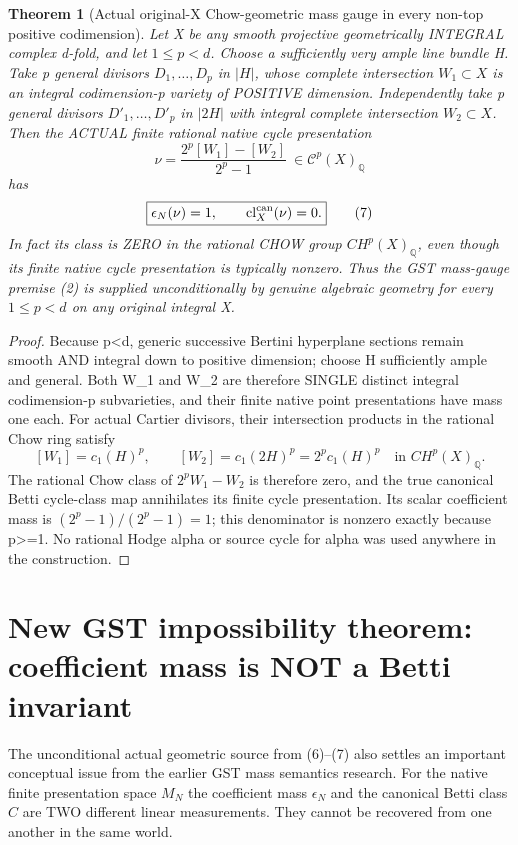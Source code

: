 \documentclass[11pt]{article}
\newtheorem{theorem}{Theorem}
\newcommand{\Q}{\mathbb Q}
\newcommand{\cl}{\mathrm{cl}}
\begin{document}
\begin{theorem}[Actual original-X Chow-geometric mass gauge in every non-top positive codimension]
Let X be any smooth projective geometrically
INTEGRAL complex d-fold, and let
\(1\le p<d\). Choose a sufficiently very ample
line bundle H. Take p general divisors
\(D_1,\ldots,D_p\) in \(|H|\), whose complete
intersection \(W_1\subset X\) is an integral
codimension-p variety of POSITIVE dimension.
Independently take p general divisors
\(D'_1,\ldots,D'_p\) in \(|2H|\) with integral
complete intersection \(W_2\subset X\).
Then the ACTUAL finite rational native cycle
presentation
\[
 \boxed{
 \nu=\frac{2^p[W_1]-[W_2]}{2^p-1}
       \ \in\mathcal C^p(X)_\Q
 }                                                        \tag{6}
\]
has
\[
 \boxed{\epsilon_N(\nu)=1,\qquad
          \cl_X^{\rm can}(\nu)=0.}                \tag{7}
\]
In fact its class is ZERO in the rational CHOW
group \(CH^p(X)_\Q\), even though its finite
native cycle presentation is typically nonzero.
Thus the GST mass-gauge premise (2) is supplied
unconditionally by genuine algebraic geometry
for every \(1\le p<d\) on any original integral X.
\end{theorem}
\begin{proof}
Because p<d, generic successive Bertini hyperplane
sections remain smooth AND integral down to positive
dimension; choose H sufficiently ample and general.
Both W_1 and W_2 are therefore SINGLE distinct
integral codimension-p subvarieties, and their
finite native point presentations have mass one each.
For actual Cartier divisors, their intersection
products in the rational Chow ring satisfy
\[
 [W_1]=c_1(H)^p,\qquad
 [W_2]=c_1(2H)^p=2^p c_1(H)^p
                       \quad\text{in }CH^p(X)_\Q .
\]
The rational Chow class of \(2^p W_1-W_2\) is
therefore zero, and the true canonical Betti
cycle-class map annihilates its finite cycle
presentation. Its scalar coefficient mass is
\((2^p-1)/(2^p-1)=1\); this denominator is
nonzero exactly because p>=1.
No rational Hodge alpha or source cycle for
alpha was used anywhere in the construction.
\end{proof}

\section{New GST impossibility theorem: coefficient mass is NOT a Betti invariant}
The unconditional
actual geometric
source from
(6)--(7)
also settles an
important
conceptual
issue from
the earlier
GST mass
semantics
research.
For the
native finite
presentation
space
\(M_N\)
the
coefficient mass
\(\epsilon_N\)
and the
canonical
Betti class
\(C\)
are
TWO
different
linear
measurements.
They
cannot
be
recovered
from
one
another
in
the
same
world.
\end{document}
